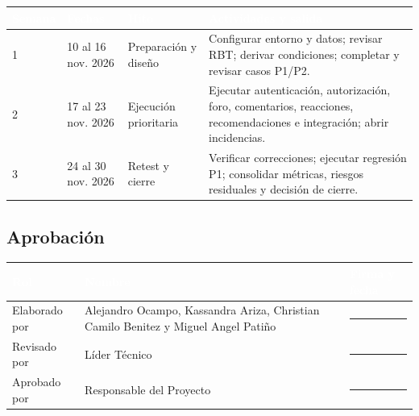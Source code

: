 \documentclass[11pt,a4paper]{article}
\newcommand{\thead}[1]{\textcolor{white}{\textbf{#1}}}
\begin{document}
\begin{tabularx}{\textwidth}{p{1.5cm}p{2.2cm}p{2.5cm}Y}
\thead{Semana} & \thead{Fechas} & \thead{Hito} & \thead{Actividades y salida}\\
 & 10 al 16 nov. 2026 & Preparación y diseño & Configurar entorno y datos; revisar RBT; derivar condiciones; completar y revisar casos P1/P2.\\
2 & 17 al 23 nov. 2026 & Ejecución prioritaria & Ejecutar autenticación, autorización, foro, comentarios, reacciones, recomendaciones e integración; abrir incidencias.\\
3 & 24 al 30 nov. 2026 & Retest y cierre & Verificar correcciones; ejecutar regresión P1; consolidar métricas, riesgos residuales y decisión de cierre.\\
\end{tabularx}

\subsection{Aprobación}
\vspace{0.4cm}
\begin{tabularx}{\textwidth}{p{3.1cm}Yp{4.0cm}}
\thead{Rol} & \thead{Nombre} & \thead{Firma y fecha}\\
\midrule
Elaborado por & Alejandro Ocampo, Kassandra Ariza, Christian Camilo Benitez y Miguel Angel Patiño & \rule{3.5cm}{0.4pt}\\[1.1cm]
Revisado por & Líder Técnico & \rule{3.5cm}{0.4pt}\\[1.1cm]
Aprobado por & Responsable del Proyecto & \rule{3.5cm}{0.4pt}\\[1.1cm]
\end{tabularx}
\end{document}
